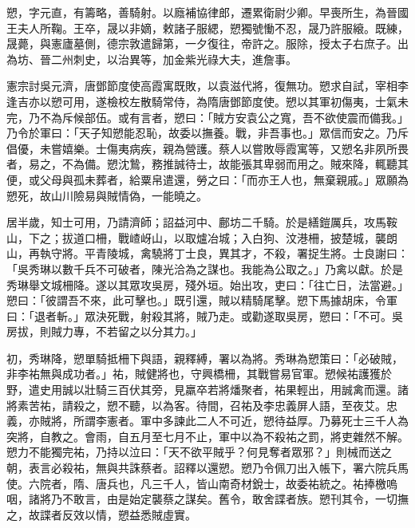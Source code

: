\begin{pinyinscope}
 愬，字元直，有籌略，善騎射。以廕補協律郎，遷累衛尉少卿。早喪所生，為晉國王夫人所鞠。王卒，晟以非嫡，敕諸子服緦，愬獨號慟不忍，晟乃許服縗。既練，晟薨，與憲廬墓側，德宗敦遣歸第，一夕復往，帝許之。服除，授太子右庶子。出為坊、晉二州刺史，以治異等，加金紫光祿大夫，進詹事。



 憲宗討吳元濟，唐鄧節度使高霞寓既敗，以袁滋代將，復無功。愬求自試，宰相李逢吉亦以愬可用，遂檢校左散騎常侍，為隋唐鄧節度使。愬以其軍初傷夷，士氣未完，乃不為斥候部伍。或有言者，愬曰：「賊方安袁公之寬，吾不欲使震而備我。」乃令於軍曰：「天子知愬能忍恥，故委以撫養。戰，非吾事也。」眾信而安之。乃斥倡優，未嘗嬉樂。士傷夷病疾，親為營護。蔡人以嘗敗辱霞寓等，又愬名非夙所畏者，易之，不為備。愬沈鷙，務推誠待士，故能張其卑弱而用之。賊來降，輒聽其便，或父母與孤未葬者，給粟帛遣還，勞之曰：「而亦王人也，無棄親戚。」眾願為愬死，故山川險易與賊情偽，一能曉之。



 居半歲，知士可用，乃請濟師；詔益河中、鄜坊二千騎。於是繕鎧厲兵，攻馬鞍山，下之；拔道口柵，戰嵖岈山，以取爐冶城；入白狗、汶港柵，披楚城，襲朗山，再執守將。平青陵城，禽驍將丁士良，異其才，不殺，署捉生將。士良謝曰：「吳秀琳以數千兵不可破者，陳光洽為之謀也。我能為公取之。」乃禽以獻。於是秀琳舉文城柵降。遂以其眾攻吳房，殘外垣。始出攻，吏曰：「往亡日，法當避。」愬曰：「彼謂吾不來，此可擊也。」既引還，賊以精騎尾擊。愬下馬據胡床，令軍曰：「退者斬。」眾決死戰，射殺其將，賊乃走。或勸遂取吳房，愬曰：「不可。吳房拔，則賊力專，不若留之以分其力。」



 初，秀琳降，愬單騎抵柵下與語，親釋縛，署以為將。秀琳為愬策曰：「必破賊，非李祐無與成功者。」祐，賊健將也，守興橋柵，其戰嘗易官軍。愬候祐護獲於野，遣史用誠以壯騎三百伏其旁，見羸卒若將燔聚者，祐果輕出，用誠禽而還。諸將素苦祐，請殺之，愬不聽，以為客。待間，召祐及李忠義屏人語，至夜艾。忠義，亦賊將，所謂李憲者。軍中多諫此二人不可近，愬待益厚。乃募死士三千人為突將，自教之。會雨，自五月至七月不止，軍中以為不殺祐之罰，將吏雜然不解。愬力不能獨完祐，乃持以泣曰：「天不欲平賊乎？何見奪者眾邪？」則械而送之朝，表言必殺祐，無與共誅蔡者。詔釋以還愬。愬乃令佩刀出入帳下，署六院兵馬使。六院者，隋、唐兵也，凡三千人，皆山南奇材銳士，故委祐統之。祐捧檄嗚咽，諸將乃不敢言，由是始定襲蔡之謀矣。舊令，敢舍諜者族。愬刊其令，一切撫之，故諜者反效以情，愬益悉賊虛實。




\end{pinyinscope}

